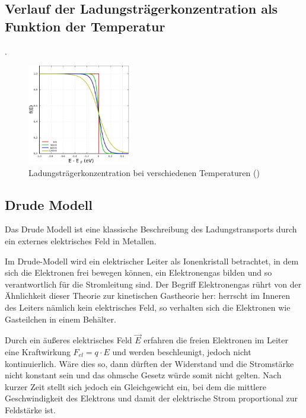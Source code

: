 \subsection{Verlauf der Ladungstr\"agerkonzentration als Funktion der Temperatur }\label{k3:ladungstraegerkonz}
.

\begin{figure}[H]
    \centering
    \includegraphics[width=0.4\textwidth]{fig/fermi}
    \caption{Ladungstr\"agerkonzentration bei verschiedenen Temperaturen ()}
    \label{fig:fermi2}
\end{figure}

\subsection{Drude Modell }\label{k3:drude}

Das Drude Modell ist eine klassische Beschreibung des Ladungstransports durch ein externes elektrisches Feld in Metallen.

Im Drude-Modell wird ein elektrischer Leiter als Ionenkristall betrachtet, in dem sich die Elektronen frei bewegen können, ein Elektronengas bilden und so verantwortlich für die Stromleitung sind. Der Begriff Elektronengas rührt von der Ähnlichkeit dieser Theorie zur kinetischen Gastheorie her: herrscht im Inneren des Leiters nämlich kein elektrisches Feld, so verhalten sich die Elektronen wie Gasteilchen in einem Behälter.

Durch ein äußeres elektrisches Feld $\vec {E}$ erfahren die freien Elektronen im Leiter eine Kraftwirkung $F_{el} = q \cdot E$ und werden beschleunigt, jedoch nicht kontinuierlich. Wäre dies so, dann dürften der Widerstand und die Stromstärke nicht konstant sein und das ohmsche Gesetz würde somit nicht gelten. Nach kurzer Zeit stellt sich jedoch ein Gleichgewicht ein, bei dem die mittlere Geschwindigkeit des Elektrons und damit der elektrische Strom proportional zur Feldstärke ist.

